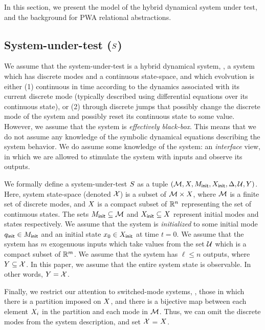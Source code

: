 In this section, we present the model of the hybrid dynamical system
under test, and the background for PWA relational abstractions.


\subsection{System-under-test ($S$)}

We assume that the system-under-test is a hybrid dynamical system, \ie, a
system which has discrete modes and a continuous state-space, and which
evolvution is either (1) continuous in time according to the dynamics
associated with its current discrete mode (typically described using
differential equations over its continuous state), or (2) through
discrete jumps that possibly change the discrete mode of the system and
possibly reset its continuous state to some value.  However, we assume
that the system is {\em effectively black-box}. This means that we do not
assume any knowledge of the symbolic dynamical equations describing the
system behavior. We do assume some knowledge of the system: an {\em
interface} view, in which we are allowed to stimulate the system with
inputs and observe its outputs. 

We formally define a system-under-test $S$ as a tuple $(\mathcal{M},
X, M_{\mathsf{init}}, X_{\mathsf{init}}, \Delta, \mathcal{U}, Y)$.
Here, system state-space (denoted $\mathcal{X}$) is a subset of
$\mathcal{M} \times X$, where $\mathcal{M}$ is a finite set of
discrete modes, and $X$ is a compact subset of $\mathbb{R}^n$
representing the set of continuous states.  The sets $M_{\mathsf{init}}
\subseteq \mathcal{M}$ and $X_{\mathsf{init}} \subseteq X$ represent
initial modes and states respectively.  We assume that the system is
{\em initialized} to some initial mode $q_{\mathsf{init}} \in M_{\mathsf{init}}$ and
an initial state $x_0 \in X_{\mathsf{init}}$ at time $t=0$.  We
assume that the system has $m$ exogenuous inputs which take values
from the set $\mathcal{U}$ which is a compact subset of $\mathbb{R}^m$. We
assume that the system has $\ell \le n$ outputs, where $Y
\subseteq \mathcal{X}$. In this paper, we assume that the entire
system state is observable.  In other words, $Y =
\mathcal{X}$. 

Finally, we restrict our attention to switched-mode systems, \ie, those in
which there is a partition imposed on $X$, and there is a
bijective map between each element $X_i$ in the partition and
each mode in $\mathcal{M}$. Thus, we can omit the discrete modes from the
system description, and set $\mathcal{X}$ = $X$.

